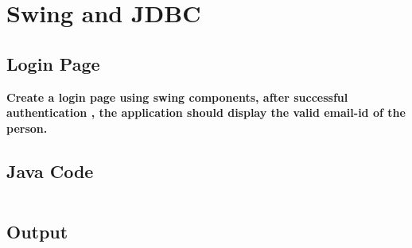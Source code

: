 \chapter{Swing and JDBC}
\section{Login Page}
{\selectfont \textbf{Create a login page using swing components, after successful authentication , the application should display the valid email-id of the person. \\
}}

\section*{Java Code}

\begin{Verbatim}

\end{Verbatim}

\section*{Output}
\begin{Verbatim}



\end{Verbatim}

